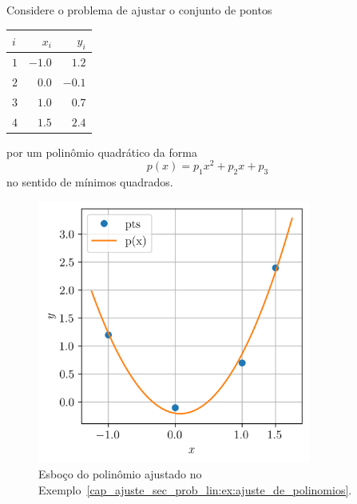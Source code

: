\begin{ex}\label{cap_ajuste_sec_prob_lin:ex:ajuste_de_polinomios}
  Considere o problema de ajustar o conjunto de pontos
  \begin{center}
    \begin{tabular}{lrr}
      $i$ & $x_i$ & $y_i$\\\hline
      $1$ & $-1.0$ &  $1.2$\\
      $2$ &  $0.0$ & $-0.1$\\
      $3$ &  $1.0$ &  $0.7$\\
      $4$ &  $1.5$ &  $2.4$\\\hline
    \end{tabular}
  \end{center}
  por um polinômio quadrático da forma
  \begin{equation}
    p(x) = p_1x^2 + p_2x + p_3
  \end{equation}
  no sentido de mínimos quadrados.  

  \begin{figure}[H]
    \centering
    \includegraphics[width=0.8\textwidth]{cap_ajuste/dados/fig_mqPoli/fig}
    \caption{Esboço do polinômio ajustado no Exemplo~\ref{cap_ajuste_sec_prob_lin:ex:ajuste_de_polinomios}.}
    \label{cap_ajuste_sec_prob_lin:fig:ex_mq_poli}
  \end{figure}
  

\end{ex}
